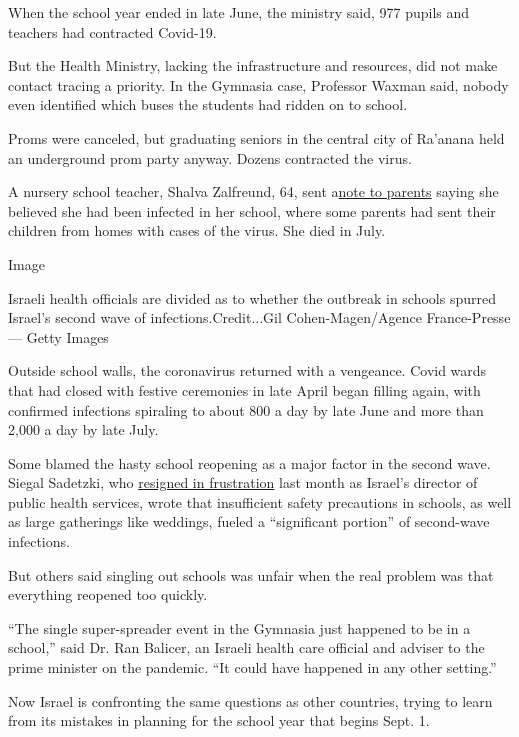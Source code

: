 When the school year ended in late June, the ministry said, 977 pupils
and teachers had contracted Covid-19.

But the Health Ministry, lacking the infrastructure and resources, did
not make contact tracing a priority. In the Gymnasia case, Professor
Waxman said, nobody even identified which buses the students had ridden
on to school.

Proms were canceled, but graduating seniors in the central city of
Ra'anana held an underground prom party anyway. Dozens contracted the
virus.

A nursery school teacher, Shalva Zalfreund, 64, sent
a\href{https://www.facebook.com/photo.php?fbid=2694147267485782\&set=a.1636227159944470\&type=3\&theater}{note
to parents} saying she believed she had been infected in her school,
where some parents had sent their children from homes with cases of the
virus. She died in July.

Image

Israeli health officials are divided as to whether the outbreak in
schools spurred Israel's second wave of infections.Credit...Gil
Cohen-Magen/Agence France-Presse --- Getty Images

Outside school walls, the coronavirus returned with a vengeance. Covid
wards that had closed with festive ceremonies in late April began
filling again, with confirmed infections spiraling to about 800 a day by
late June and more than 2,000 a day by late July.

Some blamed the hasty school reopening as a major factor in the second
wave. Siegal Sadetzki, who
\href{https://www.timesofisrael.com/top-health-ministry-official-quits-warns-israel-heading-down-dangerous-path/}{resigned
in frustration} last month as Israel's director of public health
services, wrote that insufficient safety precautions in schools, as well
as large gatherings like weddings, fueled a ``significant portion'' of
second-wave infections.

But others said singling out schools was unfair when the real problem
was that everything reopened too quickly.

``The single super-spreader event in the Gymnasia just happened to be in
a school,'' said Dr. Ran Balicer, an Israeli health care official and
adviser to the prime minister on the pandemic. ``It could have happened
in any other setting.''

Now Israel is confronting the same questions as other countries, trying
to learn from its mistakes in planning for the school year that begins
Sept. 1.

